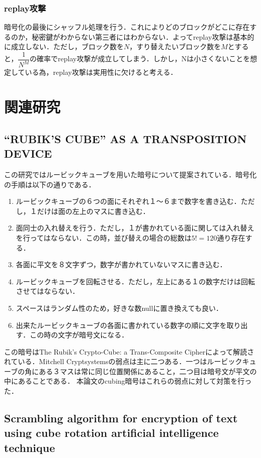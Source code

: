 \documentclass{jsarticle}
\begin{document}
\subsubsection{replay攻撃}
暗号化の最後にシャッフル処理を行う．これによりどのブロックがどこに存在するのか，秘密鍵がわからない第三者にはわからない．よってreplay攻撃は基本的に成立しない．ただし，ブロック数を$N$，すり替えたいブロック数を$M$とすると，$\dfrac{1}{N^M}$の確率でreplay攻撃が成立してしまう．しかし，Nは小さくないことを想定している為，replay攻撃は実用性に欠けると考える．

\section{関連研究}
\subsection{“RUBIK'S CUBE” AS A TRANSPOSITION DEVICE\cite{Mitchell}}
この研究ではルービックキューブを用いた暗号について提案されている．暗号化の手順は以下の通りである．
\begin{enumerate}
  \item ルービックキューブの６つの面にそれぞれ１〜６まで数字を書き込む．ただし，１だけは面の左上のマスに書き込む．
  \item 面同士の入れ替えを行う．ただし，１が書かれている面に関しては入れ替えを行ってはならない．この時，並び替えの場合の総数は$5!=120$通り存在する．
  \item 各面に平文を８文字ずつ，数字が書かれていないマスに書き込む．
  \item ルービックキューブを回転させる．ただし，左上にある１の数字だけは回転させてはならない．
  \item スペースはランダム性のため，好きな数nullに置き換えても良い．
  \item 出来たルービックキューブの各面に書かれている数字の順に文字を取り出す．この時の文字が暗号文になる．
\end{enumerate}

この暗号はThe Rubik's Crypto-Cube: a Trans-Composite Cipher\cite{Trans-Composite Cipher}によって解読されている．Mitchell Cryptsystemsの弱点は主に二つある．一つはルービックキューブの角にある３マスは常に同じ位置関係にあること，二つ目は暗号文が平文の中にあることである．
本論文のcubing暗号はこれらの弱点に対して対策を行った．


\subsection{Scrambling algorithm for encryption of text using cube rotation artificial intelligence technique\cite{Scrambling algorithm}}
\end{document}
